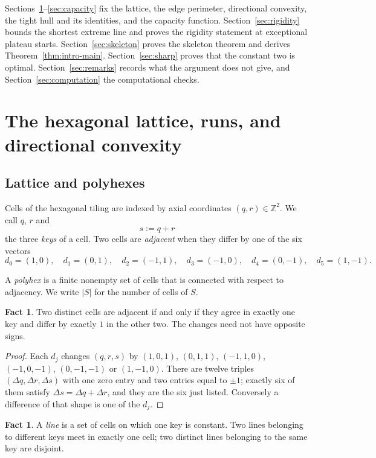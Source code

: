 \documentclass[11pt]{article}
\theoremstyle{plain}
\theoremstyle{definition}
\newtheorem{fact}[theorem]{Fact}
\theoremstyle{remark}
\newcommand{\Z}{\mathbb{Z}}
\begin{document}
Sections~\ref{sec:prelim}--\ref{sec:capacity} fix the lattice, the edge perimeter,
directional convexity, the tight hull and its identities, and the capacity function.
Section~\ref{sec:rigidity} bounds the shortest extreme line and proves the rigidity
statement at exceptional plateau starts. Section~\ref{sec:skeleton} proves the skeleton
theorem and derives Theorem~\ref{thm:intro-main}. Section~\ref{sec:sharp} proves that the
constant two is optimal. Section~\ref{sec:remarks} records what the argument does not
give, and Section~\ref{sec:computation} the computational checks.


\section{The hexagonal lattice, runs, and directional convexity}\label{sec:prelim}

\subsection{Lattice and polyhexes}\label{sec:2.1}

Cells of the hexagonal tiling are indexed by axial coordinates
\((q,r)\in\Z^{2}\). We call \(q\), \(r\) and
\[
   s:=q+r
\]
the three \emph{keys} of a cell. Two cells are \emph{adjacent} when they differ by one of the six
vectors
\[
   d_{0}=(1,0),\quad d_{1}=(0,1),\quad d_{2}=(-1,1),\quad
   d_{3}=(-1,0),\quad d_{4}=(0,-1),\quad d_{5}=(1,-1).
\]

A \emph{polyhex} is a finite nonempty set of cells that is connected with respect to
adjacency. We write \(|S|\) for the number of cells of \(S\).

\begin{fact}\label{f:1}
Two distinct cells are adjacent if and only if they agree in exactly one key and differ
by exactly \(1\) in the other two. The changes need not have opposite signs.
\end{fact}

\begin{proof}
Each \(d_{j}\) changes \((q,r,s)\) by \((1,0,1)\), \((0,1,1)\), \((-1,1,0)\),
\((-1,0,-1)\), \((0,-1,-1)\) or \((1,-1,0)\). There are twelve triples
\((\Delta q,\Delta r,\Delta s)\) with one zero entry and two entries equal to
\(\pm1\); exactly six of them satisfy \(\Delta s=\Delta q+\Delta r\), and they are
the six just listed. Conversely a difference of that shape is one of the \(d_{j}\).
\end{proof}

\begin{fact}\label{f:2}
A \emph{line} is a set of cells on which one key is constant. Two lines belonging to
different keys meet in exactly one cell; two distinct lines belonging to the same key are
disjoint.
\end{fact}
\end{document}
